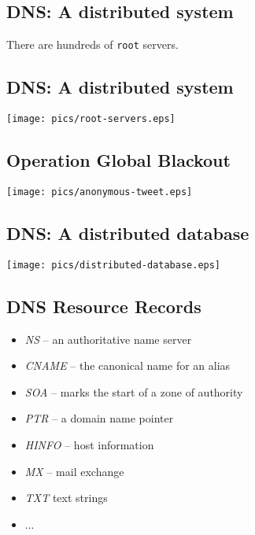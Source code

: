 \documentclass[xga]{xdvislides}
\begin{document}
\subsection{DNS: A distributed system}
\vspace{.5in}
\begin{center}
	\Huge
	There are hundreds of \verb+root+ servers. \\
\end{center}
\Normalsize

\subsection{DNS: A distributed system}
\vspace*{\fill}
\begin{center}
	\texttt{[image: pics/root-servers.eps]}
\end{center}
\vspace*{\fill}

\subsection{Operation Global Blackout}
\vspace*{\fill}
\begin{center}
	\texttt{[image: pics/anonymous-tweet.eps]} \\
\end{center}
\vspace*{\fill}

\subsection{DNS: A distributed database}
\vspace*{\fill}
\begin{center}
	\texttt{[image: pics/distributed-database.eps]}
\end{center}
\vspace*{\fill}


\subsection{DNS Resource Records}
\begin{itemize}
	\item {\em NS} -- an authoritative name server
	\item {\em CNAME} -- the canonical name for an alias
	\item {\em SOA} -- marks the start of a zone of authority
	\item {\em PTR} -- a domain name pointer
	\item {\em HINFO} -- host information
	\item {\em MX} -- mail exchange
	\item {\em TXT} text strings
	\item ...
\end{itemize}
\end{document}
